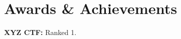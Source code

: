 \section{Awards \& Achievements}
  
  
    \itemizeCVBegin
    
        \small{\item{
            \textbf{XYZ CTF:}{ Ranked 1.} \\ \vspace{3pt}
        }}
    
    \itemizeCVEnd

